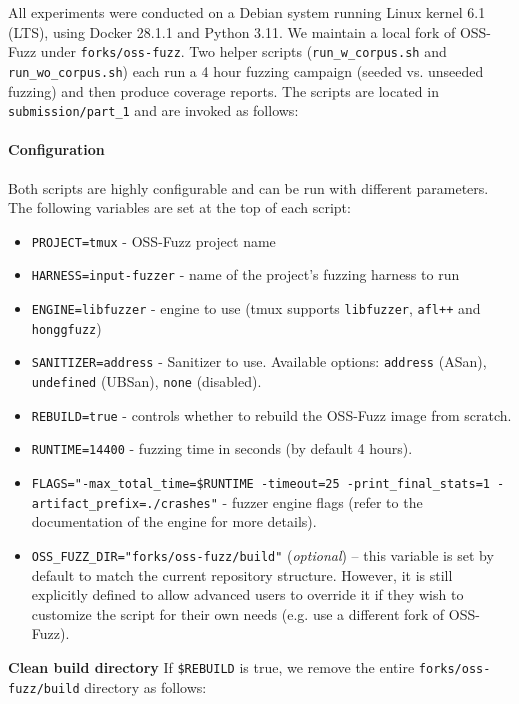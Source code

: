 All experiments were conducted on a Debian system running Linux kernel 6.1 (LTS), using Docker 28.1.1 and Python 3.11. We maintain a local fork of OSS-Fuzz under \texttt{forks/oss-fuzz}. Two helper scripts (\texttt{run\_w\_corpus.sh} and \texttt{run\_wo\_corpus.sh}) each run a 4 hour fuzzing campaign (seeded vs. unseeded fuzzing) and then produce coverage reports. The scripts are located in \texttt{submission/part\_1} and are invoked as follows:

\noindent \paragraph{Configuration} \label{sec:methodology_configuration} Both scripts are highly configurable and can be run with different parameters. The following variables are set at the top of each script:
\begin{itemize}
	\item \texttt{PROJECT=tmux} - OSS-Fuzz project name
	\item \texttt{HARNESS=input-fuzzer} - name of the project's fuzzing harness to run
	\item \texttt{ENGINE=libfuzzer} - engine to use (tmux supports \texttt{libfuzzer}, \texttt{afl++} and \texttt{honggfuzz})
	\item \texttt{SANITIZER=address} - Sanitizer to use. Available options: \texttt{address} (ASan), \texttt{undefined} (UBSan), \texttt{none} (disabled). \cite{oss-fuzz:tmux_project_yaml}
	\item \texttt{REBUILD=true} - controls whether to rebuild the OSS-Fuzz image from scratch.
	\item \texttt{RUNTIME=14400} - fuzzing time in seconds (by default 4 hours).
	\item \texttt{FLAGS="-max\_total\_time=\$RUNTIME -timeout=25 -print\_final\_stats=1 -artifact\_prefix=./crashes"} - fuzzer engine flags (refer to the documentation of the engine for more details).
	\item \texttt{OSS\_FUZZ\_DIR="forks/oss-fuzz/build"} (\emph{optional}) – this variable is set by default to match the current repository structure. However, it is still explicitly defined to allow advanced users to override it if they wish to customize the script for their own needs (e.g. use a different fork of OSS-Fuzz).
\end{itemize}

\noindent \textbf{Clean build directory} If \texttt{\$REBUILD} is true, we remove the entire \texttt{forks/oss-fuzz/build} directory as follows:

